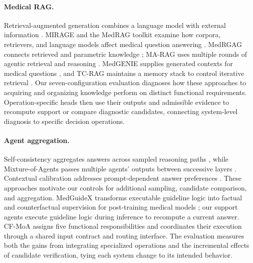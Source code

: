 \paragraph{Medical RAG.}
Retrieval-augmented generation combines a language model with external information \citep{lewis2020rag}. MIRAGE and the MedRAG toolkit examine how corpora, retrievers, and language models affect medical question answering \citep{xiong2024medrag}. MedRGAG connects retrieved and parametric knowledge \citep{li2026medrgag}; MA-RAG uses multiple rounds of agentic retrieval and reasoning \citep{wu2026marag}. MedGENIE supplies generated contexts for medical questions \citep{frisoni2024medgenie}, and TC-RAG maintains a memory stack to control iterative retrieval \citep{jiang2025tcrag}. Our seven-configuration evaluation diagnoses how these approaches to acquiring and organizing knowledge perform on distinct functional requirements. Operation-specific heads then use their outputs and admissible evidence to recompute support or compare diagnostic candidates, connecting system-level diagnosis to specific decision operations.

\paragraph{Agent aggregation.}
Self-consistency aggregates answers across sampled reasoning paths \citep{wang2023selfconsistency}, while Mixture-of-Agents passes multiple agents' outputs between successive layers \citep{wang2025moa}. Contextual calibration addresses prompt-dependent answer preferences \citep{zhao2021calibrate}. These approaches motivate our controls for additional sampling, candidate comparison, and aggregation. MedGuideX transforms executable guideline logic into factual and counterfactual supervision for post-training medical models \citep{shen2026medguidex}; our support agents execute guideline logic during inference to recompute a current answer. CF-MoA assigns five functional responsibilities and coordinates their execution through a shared input contract and routing interface. The evaluation measures both the gains from integrating specialized operations and the incremental effects of candidate verification, tying each system change to its intended behavior.
